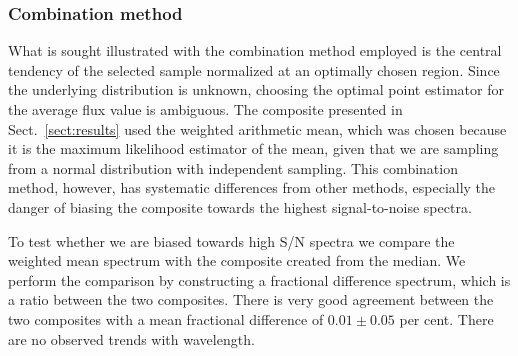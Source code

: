\documentclass{aa}    %
\newcommand{\sectionname}{Sect.}
\newcommand{\Sect}[1]{\sectionname~\ref{sect:#1}}
\newcommand{\sect}[1]{\Sect{#1}}
\newcommand{\sectlabel}[1]{\label{sect:#1}}
\begin{document}
%



\subsubsection{Combination method}  \sectlabel{Combination method}
What is sought illustrated with the combination method employed is the central
tendency of the selected sample normalized at an optimally chosen region. Since
the underlying distribution is unknown, choosing the optimal point estimator for
the average flux value is ambiguous. The composite presented in \sect{results}
used the weighted arithmetic mean, which was chosen because it is the maximum
likelihood estimator of the mean, given that we are sampling from a normal
distribution with independent sampling. This combination method, however, has
systematic differences from other methods, especially the danger of biasing the
composite towards the highest signal-to-noise spectra. 

To test whether we are biased towards high S/N spectra we compare the
weighted mean spectrum with the composite created from the median. We
perform the comparison by constructing a fractional difference
spectrum, which is a ratio between the two composites. There is very
good agreement between the two composites with a mean fractional
difference of $0.01 \pm 0.05$ per cent. There are no observed trends with wavelength.
\end{document}
